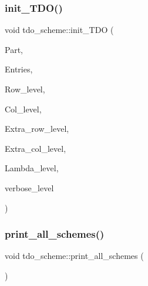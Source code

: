 \subsubsection{\texorpdfstring{init\+\_\+\+T\+D\+O()}{init\_TDO()}}
{\footnotesize\ttfamily void tdo\+\_\+scheme\+::init\+\_\+\+T\+DO (\begin{DoxyParamCaption}\item[{\mbox{\hyperlink{galois_8h_a09fddde158a3a20bd2dcadb609de11dc}{I\+NT}} $\ast$}]{Part,  }\item[{\mbox{\hyperlink{galois_8h_a09fddde158a3a20bd2dcadb609de11dc}{I\+NT}} $\ast$}]{Entries,  }\item[{\mbox{\hyperlink{galois_8h_a09fddde158a3a20bd2dcadb609de11dc}{I\+NT}}}]{Row\+\_\+level,  }\item[{\mbox{\hyperlink{galois_8h_a09fddde158a3a20bd2dcadb609de11dc}{I\+NT}}}]{Col\+\_\+level,  }\item[{\mbox{\hyperlink{galois_8h_a09fddde158a3a20bd2dcadb609de11dc}{I\+NT}}}]{Extra\+\_\+row\+\_\+level,  }\item[{\mbox{\hyperlink{galois_8h_a09fddde158a3a20bd2dcadb609de11dc}{I\+NT}}}]{Extra\+\_\+col\+\_\+level,  }\item[{\mbox{\hyperlink{galois_8h_a09fddde158a3a20bd2dcadb609de11dc}{I\+NT}}}]{Lambda\+\_\+level,  }\item[{\mbox{\hyperlink{galois_8h_a09fddde158a3a20bd2dcadb609de11dc}{I\+NT}}}]{verbose\+\_\+level }\end{DoxyParamCaption})}

\mbox{\label{classtdo__scheme_af63472d1eeb3ba8f1cca5e37ebe6b769}} 
\subsubsection{\texorpdfstring{print\+\_\+all\+\_\+schemes()}{print\_all\_schemes()}}
{\footnotesize\ttfamily void tdo\+\_\+scheme\+::print\+\_\+all\+\_\+schemes (\begin{DoxyParamCaption}{ }\end{DoxyParamCaption})}

\mbox{\label{classtdo__scheme_af3d21e7abf7ef3b83d9ead5629687634}} 
